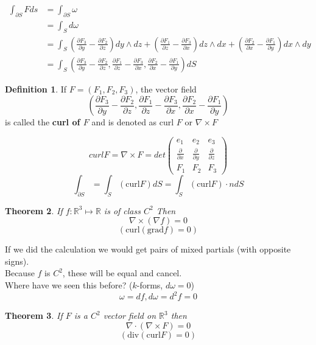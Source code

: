 \documentclass[12pt]{article}
\theoremstyle{plain}
\newtheorem{theorem}{Theorem}[section]
\theoremstyle{definition}
\newtheorem{definition}[theorem]{Definition}
\begin{document}
\begin{align*}
	\int_{\partial S} F ds &= \int_{\partial S} \omega\\
	 &= \int_S d\omega\\
	 &= \int_S (\frac{\partial F_3}{\partial y}-\frac{\partial F_2}{\partial z})dy \wedge dz + (\frac{\partial F_1}{\partial z}-\frac{\partial F_3}{\partial x})dz\wedge dx + (\frac{\partial F_2}{\partial x}-\frac{\partial F_1}{\partial y})dx\wedge dy\\
	 &= \int_S (\frac{\partial F_3}{\partial y}-\frac{\partial F_2}{\partial z}, \frac{\partial F_1}{\partial z} - \frac{\partial F_3}{\partial x}, \frac{\partial F_2}{\partial x} - \frac{\partial F_1}{\partial y})dS
\end{align*}

\begin{definition}
	If $F=(F_1, F_2, F_3)$, the vector field
	$$(\frac{\partial F_3}{\partial y}-\frac{\partial F_2}{\partial z}, \frac{\partial F_1}{\partial z} - \frac{\partial F_3}{\partial x}, \frac{\partial F_2}{\partial x} - \frac{\partial F_1}{\partial y})$$
	is called the \textbf{curl of $F$} and is denoted as curl $F$ or $\nabla \times F$
\end{definition}

$$curl F = \nabla \times F = det\begin{pmatrix}
e_1 & e_2 & e_3 \\
\frac{\partial}{\partial x} & \frac{\partial}{\partial y} & \frac{\partial}{\partial z}\\
F_1 & F_2 & F_3
\end{pmatrix}$$
$$\int_{\partial S} = \int_S (\text{curl} F)dS = \int_S (\text{curl} F)\cdot n dS$$

\begin{theorem}
	If $f:\mathbb{R}^3\mapsto\mathbb{R}$ is of class $C^2$ Then
	$$\nabla \times (\nabla f) = 0$$
	$$(\text{curl}(\text{grad} f) = 0)$$
\end{theorem}

If we did the calculation we would get pairs of mixed partials (with opposite signs).\\
Because $f$ is $C^2$, these will be equal and cancel.\\
Where have we seen this before? ($k$-forms, $d\omega = 0$)
$$\omega=df, d\omega = d^2 f = 0$$

\begin{theorem}
	If $F$ is a $C^2$ vector field on $\mathbb{R}^3$ then
	$$\nabla \cdot (\nabla \times F) = 0$$
	$$(\text{div}(\text{curl} F) = 0)$$
\end{theorem}
\end{document}
